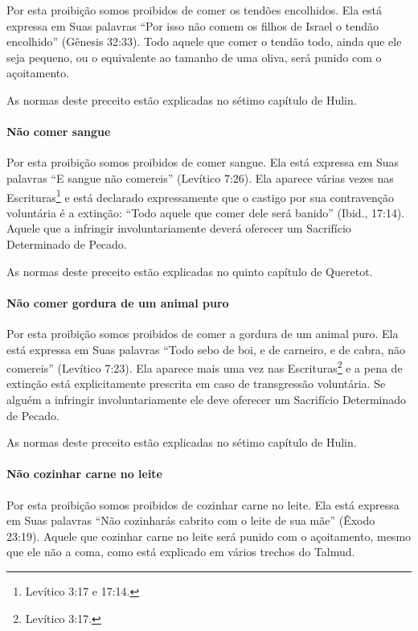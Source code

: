 Por esta proibição somos proibidos de comer os tendões encolhidos. Ela
está expressa em Suas palavras ``Por isso não comem os filhos de Israel
o tendão encolhido'' (Gênesis 32:33). Todo aquele que comer o tendão
todo, ainda que ele seja pequeno, ou o equivalente ao tamanho de uma
oliva, será punido com o açoitamento.

As normas deste preceito estão explicadas no sétimo capítulo de Hulin.

\paragraph{Não comer sangue}

Por esta proibição somos proibidos de comer sangue. Ela está expressa
em Suas palavras ``E sangue não comereis'' (Levítico 7:26). Ela aparece
várias vezes nas Escrituras\footnote{Levítico 3:17 e 17:14.} e está declarado
expressamente que o castigo por sua contravenção voluntária é a
extinção: ``Todo aquele que comer dele será banido'' (Ibid., 17:14).
Aquele que a infringir involuntariamente deverá oferecer um Sacrifício
Determinado de Pecado.

As normas deste preceito estão explicadas no quinto capítulo de Queretot.

\paragraph{Não comer gordura de um animal puro}

Por esta proibição somos proibidos de comer a gordura de um animal
puro. Ela está expressa em Suas palavras ``Todo sebo de boi, e de
carneiro, e de cabra, não comereis'' (Levítico 7:23). Ela aparece mais
uma vez nas Escrituras\footnote{Levítico 3:17.} e a pena de extinção está
explicitamente prescrita em caso de transgressão voluntária. Se alguém a
infringir involuntariamente ele deve oferecer um Sacrifício Determinado
de Pecado.

As normas deste preceito estão explicadas no sétimo capítulo de Hulin.

\paragraph{Não cozinhar carne no leite}

Por esta proibição somos proibidos de cozinhar carne no leite. Ela está
expressa em Suas palavras ``Não cozinharás cabrito com o leite de sua
mãe'' (Êxodo 23:19). Aquele que cozinhar carne no leite será punido com o
açoitamento, mesmo que ele não a coma, como está explicado em vários
trechos do Talmud.

